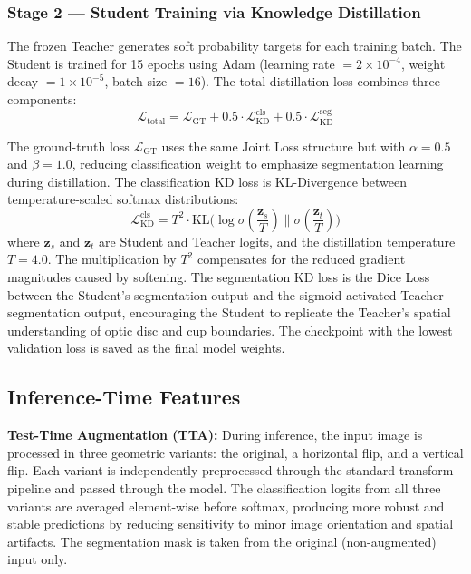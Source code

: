 \documentclass[conference]{IEEEtran}
\begin{document}
\subsubsection{Stage 2 --- Student Training via Knowledge Distillation}
The frozen Teacher generates soft probability targets for each training batch. The Student is trained for 15 epochs using Adam (learning rate $= 2{\times}10^{-4}$, weight decay $= 1{\times}10^{-5}$, batch size $= 16$). The total distillation loss combines three components:
\begin{equation}
    \mathcal{L}_{\text{total}} = \mathcal{L}_{\text{GT}} + 0.5 \cdot \mathcal{L}_{\text{KD}}^{\text{cls}} + 0.5 \cdot \mathcal{L}_{\text{KD}}^{\text{seg}}
\end{equation}

The ground-truth loss $\mathcal{L}_{\text{GT}}$ uses the same Joint Loss structure but with $\alpha{=}0.5$ and $\beta{=}1.0$, reducing classification weight to emphasize segmentation learning during distillation. The classification KD loss is KL-Divergence between temperature-scaled softmax distributions:
\begin{equation}
    \mathcal{L}_{\text{KD}}^{\text{cls}} = T^2 \cdot \text{KL}\Big(\log\sigma\!\left(\frac{\mathbf{z}_s}{T}\right) \Big\| \sigma\!\left(\frac{\mathbf{z}_t}{T}\right)\Big)
\end{equation}
where $\mathbf{z}_s$ and $\mathbf{z}_t$ are Student and Teacher logits, and the distillation temperature $T{=}4.0$. The multiplication by $T^2$ compensates for the reduced gradient magnitudes caused by softening. The segmentation KD loss is the Dice Loss between the Student's segmentation output and the sigmoid-activated Teacher segmentation output, encouraging the Student to replicate the Teacher's spatial understanding of optic disc and cup boundaries. The checkpoint with the lowest validation loss is saved as the final model weights.

\subsection{Inference-Time Features}

\textbf{Test-Time Augmentation (TTA):} During inference, the input image is processed in three geometric variants: the original, a horizontal flip, and a vertical flip. Each variant is independently preprocessed through the standard transform pipeline and passed through the model. The classification logits from all three variants are averaged element-wise before softmax, producing more robust and stable predictions by reducing sensitivity to minor image orientation and spatial artifacts. The segmentation mask is taken from the original (non-augmented) input only.
\end{document}
